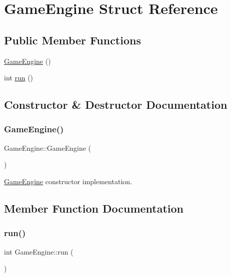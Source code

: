 \hypertarget{structGameEngine}{}\section{Game\+Engine Struct Reference}
\label{structGameEngine}
\subsection*{Public Member Functions}
\begin{DoxyCompactItemize}
\item 
\hyperlink{structGameEngine_a64c430f74d72e2745646fdbffbd97930}{Game\+Engine} ()
\item 
int \hyperlink{structGameEngine_afce061bad86852157c14fb6db3ba4887}{run} ()
\end{DoxyCompactItemize}


\subsection{Constructor \& Destructor Documentation}
\mbox{\label{structGameEngine_a64c430f74d72e2745646fdbffbd97930}} 
\subsubsection{\texorpdfstring{Game\+Engine()}{GameEngine()}}
{\footnotesize\ttfamily Game\+Engine\+::\+Game\+Engine (\begin{DoxyParamCaption}{ }\end{DoxyParamCaption})}

\hyperlink{structGameEngine}{Game\+Engine} constructor implementation. 

\subsection{Member Function Documentation}
\mbox{\label{structGameEngine_afce061bad86852157c14fb6db3ba4887}} 
\subsubsection{\texorpdfstring{run()}{run()}}
{\footnotesize\ttfamily int Game\+Engine\+::run (\begin{DoxyParamCaption}{ }\end{DoxyParamCaption})}

